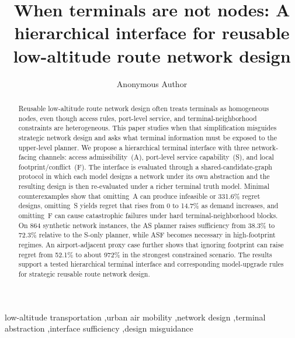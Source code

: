 \documentclass[review,authoryear]{elsarticle}
\begin{document}
\begin{frontmatter}

\title{When terminals are not nodes: A hierarchical interface for reusable low-altitude route network design}

\author[inst1]{Anonymous Author}


\begin{abstract}
Reusable low-altitude route network design often treats terminals as homogeneous nodes, even though access rules, port-level service, and terminal-neighborhood constraints are heterogeneous. This paper studies when that simplification misguides strategic network design and asks what terminal information must be exposed to the upper-level planner. We propose a hierarchical terminal interface with three network-facing channels: access admissibility~(A), port-level service capability~(S), and local footprint/conflict~(F). The interface is evaluated through a shared-candidate-graph protocol in which each model designs a network under its own abstraction and the resulting design is then re-evaluated under a richer terminal truth model. Minimal counterexamples show that omitting~A can produce infeasible or 331.6\% regret designs, omitting~S yields regret that rises from 0 to 14.7\% as demand increases, and omitting~F can cause catastrophic failures under hard terminal-neighborhood blocks. On 864 synthetic network instances, the AS planner raises sufficiency from 38.3\% to 72.3\% relative to the S-only planner, while ASF becomes necessary in high-footprint regimes. An airport-adjacent proxy case further shows that ignoring footprint can raise regret from 52.1\% to about 972\% in the strongest constrained scenario. The results support a tested hierarchical terminal interface and corresponding model-upgrade rules for strategic reusable route network design.
\end{abstract}

\begin{keyword}
low-altitude transportation \sep urban air mobility \sep network design \sep terminal abstraction \sep interface sufficiency \sep design misguidance
\end{keyword}

\end{frontmatter}

\end{document}
